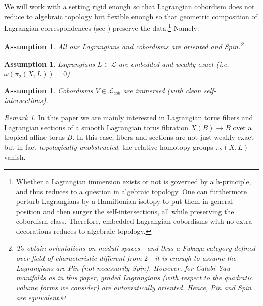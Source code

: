 \documentclass[10pt]{amsart}
\newtheorem{assumption}[thm]{Assumption}
\theoremstyle{definition}
\theoremstyle{remark}
\newtheorem{remark}[thm]{Remark}
\newcommand{\mcal}{\mathcal}
\begin{document}
We will work with a setting rigid enough so that Lagrangian cobordism does not reduce to algebraic topology but flexible enough so that geometric composition of Lagrangian correspondences (see ) preserve the data.\footnote{Whether a Lagrangian immersion exists or not is governed by a h-principle, and thus reduces to a question in algebraic topology. One can furthermore perturb Lagrangians by a Hamiltonian isotopy to put them in general position and then surger the self-intersections, all while preserving the cobordism class. Therefore, embedded Lagrangian cobordisms with no extra decorations reduces to algebraic topology.}
Namely:
\begin{assumption}\label{assumption:graded_spin}
    All our Lagrangians and cobordisms are \emph{oriented} and \emph{Spin}.\footnote{To obtain orientations on moduli-spaces---and thus a Fukaya category defined over field of characteristic different from $2$---it is enough to assume the Lagrangians are Pin (not necessarily Spin). However, for Calabi-Yau manifolds as in this paper, graded Lagrangians (with respect to the quadratic volume forms we consider) are automatically oriented. Hence, Pin and Spin are equivalent.}
\end{assumption}
\begin{assumption}\label{assumption:generators}
   Lagrangians $L \in \mcal L$ are \emph{embedded} and \emph{weakly-exact} (i.e. $\omega(\pi_2(X,L))=0$).
\end{assumption}
\begin{assumption}\label{assumption:cobordisms}
    Cobordisms $V \in \mcal L_{cob}$ are \emph{immersed} (with clean self-intersections).
\end{assumption}




\begin{remark}
    In this paper we are mainly interested in Lagrangian torus fibers and Lagrangian sections of a smooth Lagrangian torus fibration $X(B) \to B$ over a tropical affine torus $B$.
    In this case, fibers and sections are not just weakly-exact but in fact \emph{topologically unobstructed}: the relative homotopy groups $\pi_2(X, L)$ vanish.
\end{remark}
\end{document}

